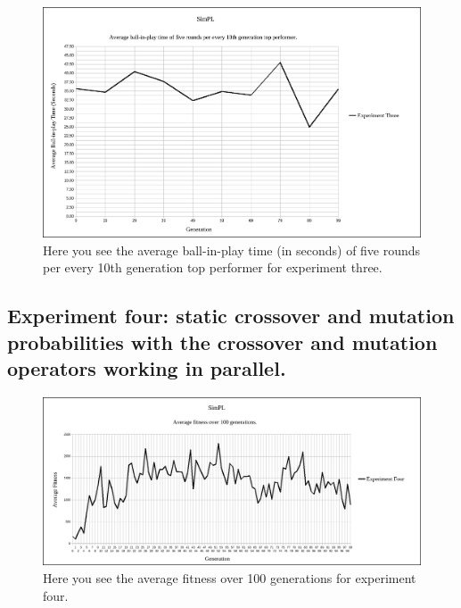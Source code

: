 \documentclass[a4paper,10pt]{article}
\begin{document}
\begin{figure}[H]  
  \centering
  \includegraphics[width=1\textwidth]{figures/exp3_10_tops_times.png}
  \caption{Here you see the average ball-in-play time (in seconds) of five rounds per every 10th generation top performer for experiment three.}
  \label{fig:exp3_10_tops_times}
\end{figure}

\subsection{Experiment four: static crossover and mutation probabilities with the crossover and mutation operators working in parallel.}

\begin{figure}[H]  
  \centering
  \includegraphics[width=1\textwidth]{figures/exp4_avg_fit.png}
  \caption{Here you see the average fitness over 100 generations for experiment four.}
  \label{fig:exp4_avg_fit}
\end{figure}
\end{document}
